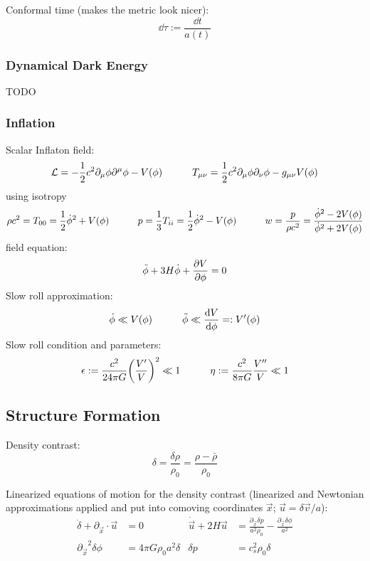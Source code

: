 		\noindent
		Conformal time (makes the metric look nicer):
		\begin{equation}
			\dd \tau := \frac{\dd t}{a(t)}
		\end{equation}

		\subsubsection{Dynamical Dark Energy}
			TODO

		\subsubsection{Inflation}
			Scalar Inflaton field:
			\begin{equation}
				\mathcal{L} = -\frac{1}{2}c^2 \partial_\mu \phi \partial^\mu \phi - V(\phi)
				\hspace{30pt}
				T_{\mu\nu} = \frac{1}{2} c^2 \partial_\mu \phi \partial_\nu \phi - g_{\mu\nu} V(\phi)
			\end{equation}
			using isotropy
			\begin{equation}
				\rho c^2 = T_{00} = \frac{1}{2} \dot{\phi}^2 + V(\phi)
				\hspace{30pt}
				p = \frac{1}{3} T_{ii} = \frac{1}{2} \dot{\phi}^2 - V(\phi)
				\hspace{30pt}
				w = \frac{p}{\rho c^2} = \frac{\dot{\phi}^2 - 2V(\phi)}{\dot{\phi}^2 + 2V(\phi)}
			\end{equation}
			field equation:
			\begin{equation}
				\ddot{\phi} + 3 H \dot{\phi} + \pdv{V}{\phi} = 0
			\end{equation}
			Slow roll approximation:
			\begin{equation}
				\dot{\phi} \ll V(\phi)
				\hspace{30pt}
				\ddot{\phi} \ll \dv{V}{\phi} =: V'(\phi)
			\end{equation}
			Slow roll condition and parameters:
			\begin{equation}
				\epsilon := \frac{c^2}{24\pi G} \qty(\frac{V'}{V})^2 \ll 1
				\hspace{30pt}
				\eta := \frac{c^2}{8\pi G} \frac{V''}{V} \ll 1
			\end{equation}

	\subsection{Structure Formation}
		Density contrast:
		\begin{equation}
			\delta  = \frac{\delta \rho}{\rho_0} = \frac{ \rho - \bar{\rho}}{\rho_0}
		\end{equation}

		\noindent
		Linearized equations of motion for the density contrast (linearized and Newtonian approximations applied and put into comoving coordinates $\vec{x}$; $\vec{u} = \delta\vec{v}/a$):
		\begin{equation}
			\begin{aligned}
				\dot{\delta} + \partial_{\vec{x}} \cdot \vec{u} &= 0 
				&
				\dot{\vec{u}} + 2 H \vec{u} &= \frac{\partial_{\vec{x}} \delta p}{a^2 \rho_0} - \frac{\partial_{\vec{x}} \delta \phi}{a^2} \\
				{\partial_{\vec{x}}}^2 \delta \phi &= 4 \pi G \rho_0 a^2 \delta
				&
				\delta p &= c_s^2 \rho_0 \delta 
			\end{aligned}
		\end{equation}

